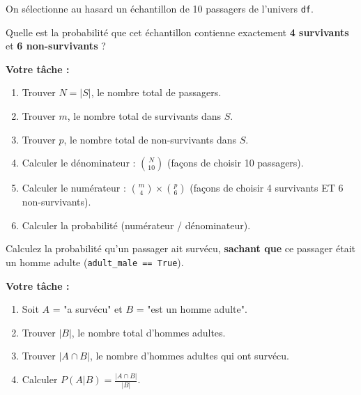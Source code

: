 \begin{exercicebox}
On sélectionne au hasard un échantillon de 10 passagers de l'univers \texttt{df}.

Quelle est la probabilité que cet échantillon contienne exactement \textbf{4 survivants} et \textbf{6 non-survivants} ?

\textbf{Votre tâche :}
\begin{enumerate}
    \item Trouver $N = |S|$, le nombre total de passagers.
    \item Trouver $m$, le nombre total de survivants dans $S$.
    \item Trouver $p$, le nombre total de non-survivants dans $S$.
    \item Calculer le dénominateur : $\binom{N}{10}$ (façons de choisir 10 passagers).
    \item Calculer le numérateur : $\binom{m}{4} \times \binom{p}{6}$ (façons de choisir 4 survivants ET 6 non-survivants).
    \item Calculer la probabilité (numérateur / dénominateur).
\end{enumerate}
\end{exercicebox}

\begin{exercicebox}
Calculez la probabilité qu'un passager ait survécu, \textbf{sachant que} ce passager était un homme adulte (\texttt{adult\_male == True}).

\textbf{Votre tâche :}
\begin{enumerate}
    \item Soit $A$ = "a survécu" et $B$ = "est un homme adulte".
    \item Trouver $|B|$, le nombre total d'hommes adultes.
    \item Trouver $|A \cap B|$, le nombre d'hommes adultes qui ont survécu.
    \item Calculer $P(A|B) = \frac{|A \cap B|}{|B|}$.
\end{enumerate}
\end{exercicebox}

